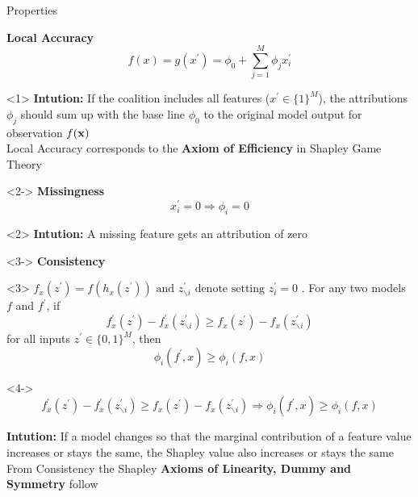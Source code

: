 \documentclass[11pt,compress,t,notes=noshow, aspectratio=169, xcolor=table]{beamer}
\begin{document}
\begin{vbframe}{Properties}

\textbf{Local Accuracy}
$$
f(x)=g\left(x^{\prime}\right)=\phi_{0}+\sum_{j=1}^{M} \phi_{j} x_{i}^{\prime}
$$
\begin{onlyenv}<1>
\textbf{Intution:} If the coalition includes all features ($x^{\prime}  \in \{1\}^M $), the attributions $\phi_j$ should sum up with the base line $\phi_0$ to the original model output for observation $f(\xv)$ \\
Local Accuracy corresponds to the \textbf{Axiom of Efficiency} in Shapley Game Theory 

\end{onlyenv}

\begin{onlyenv}<2->
\textbf{Missingness}
$$
x_{i}^{\prime}=0 \Longrightarrow \phi_{i}=0
$$
\end{onlyenv}

\begin{onlyenv}<2>
\textbf{Intution:}  A missing feature gets an attribution of zero
\end{onlyenv}

\begin{onlyenv}<3->
\textbf{Consistency} \\
\end{onlyenv}
\begin{onlyenv}<3>
$f_{x}\left(z^{\prime}\right)=f\left(h_{x}\left(z^{\prime}\right)\right) \text { and } z^{\prime}_{\backslash  i} \text{ denote setting } z_{i}^{\prime}=0$ . For any two
models $f$ and $f^{\prime}$, if
$$
f_{x}^{\prime}\left(z^{\prime}\right)-f_{x}^{\prime}\left(z^{\prime}_{\backslash i}\right) \geq f_{x}\left(z^{\prime}\right)-f_{x}\left(z^{\prime}_{\backslash i}\right)
$$
for all inputs $z^{\prime} \in \{0, 1\}^M$, then
$$
\phi_{i}\left(f^{\prime}, x\right) \geq \phi_{i}(f, x)
$$
\end{onlyenv}

\begin{onlyenv}<4->
$$
f_{x}^{\prime}\left(z^{\prime}\right)-f_{x}^{\prime}\left(z^{\prime}_{\backslash i}\right) \geq f_{x}\left(z^{\prime}\right)-f_{x}\left(z^{\prime} _{\backslash i}\right) \Longrightarrow \phi_{i}\left(f^{\prime}, x\right) \geq \phi_{i}(f, x)
$$

\textbf{Intution:} If a model changes so that the marginal contribution of a feature value increases or stays the same, the Shapley value also increases or stays the same\\ 
From Consistency the Shapley \textbf{Axioms of Linearity, Dummy and Symmetry} follow
\end{onlyenv}


\end{vbframe}
\end{document}
